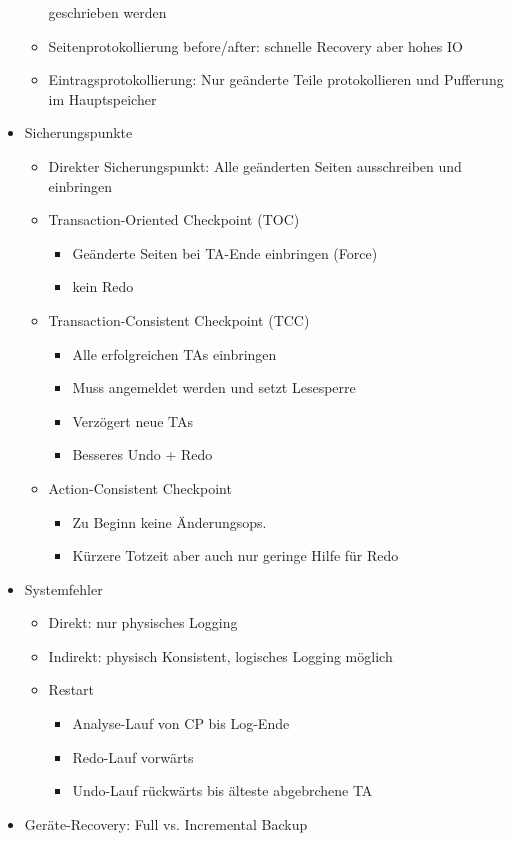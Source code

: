 \documentclass[11pt, paper=a4, twocolumn]{scrartcl}
\begin{document}
\begin{itemize}
\begin{itemize}
						geschrieben werden
					\item Seitenprotokollierung before/after: schnelle 
						Recovery aber hohes IO
					\item Eintragsprotokollierung: Nur geänderte Teile 
						protokollieren und Pufferung im 
						Hauptspeicher
				\end{itemize}
			\item Sicherungspunkte
				\begin{itemize}
					\item Direkter Sicherungspunkt: Alle geänderten 
						Seiten ausschreiben und einbringen
					\item Transaction-Oriented Checkpoint (TOC)
						\begin{itemize}
							\item Geänderte Seiten bei TA-Ende 
								einbringen (Force)
							\item kein Redo
						\end{itemize}
					\item Transaction-Consistent Checkpoint (TCC)
						\begin{itemize}
							\item Alle erfolgreichen TAs 
								einbringen
							\item Muss angemeldet werden und 
								setzt Lesesperre
							\item Verzögert neue TAs
							\item Besseres Undo + Redo
						\end{itemize}
					\item Action-Consistent Checkpoint
						\begin{itemize}
							\item Zu Beginn keine Änderungsops.
							\item Kürzere Totzeit aber auch 
								nur geringe Hilfe für Redo
						\end{itemize}
				\end{itemize}
			\item Systemfehler
				\begin{itemize}
					\item Direkt: nur physisches Logging
					\item Indirekt: physisch Konsistent, logisches 
						Logging möglich
					\item Restart
						\begin{itemize}
							\item Analyse-Lauf von CP bis 
								Log-Ende
							\item Redo-Lauf vorwärts
							\item Undo-Lauf rückwärts bis 
								älteste abgebrchene TA
						\end{itemize}
				\end{itemize}
			\item Geräte-Recovery: Full vs. Incremental Backup
		\end{itemize}
\end{document}
